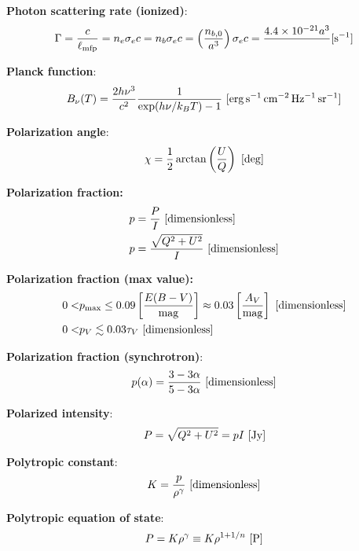 \documentclass[a4paper,10pt]{article}
\begin{document}
{\noindent}\textbf{Photon scattering rate (ionized)}:
\begin{align*}
    \Gamma = \dfrac{c}{\ell_\mathrm{mfp}} = n_e\sigma_ec = n_b\sigma_ec = \left(\dfrac{n_{b,0}}{a^3}\right)\sigma_ec = \dfrac{4.4\times10^{-21}{a^3}} ~ [{\rm s^{-1}}]
\end{align*}

{\noindent}\textbf{Planck function}:
\begin{align*}
    B_\nu(T) = \frac{2h\nu^3 }{c^2} \frac{1}{\exp(h\nu/k_BT) - 1} ~ [{\rm erg\,s^{-1}\,cm^{-2}\,Hz^{-1}\,sr^{-1}}]
\end{align*}

{\noindent}\textbf{Polarization angle}:
\begin{align*}
    \chi = \frac{1}{2}\arctan\left(\frac{U}{Q}\right) ~ [{\rm deg}]
\end{align*}

{\noindent}\textbf{Polarization fraction:}
\begin{align*}
    p &= \dfrac{P}{I} ~ [{\rm dimensionless}] \\
    p &= \frac{\sqrt{Q^2+U^2}}{I} ~ [{\rm dimensionless}]
\end{align*}

{\noindent}\textbf{Polarization fraction (max value):}
\begin{align*}
    0 < &p_\mathrm{max} \leq 0.09 \left[\frac{E(B-V)}{{\rm mag}}\right] \approx 0.03\left[\frac{A_V}{{\rm mag}}\right] ~ [{\rm dimensionless}] \\
    0 < &p_V \lesssim 0.03\tau_V ~ [{\rm dimensionless}]
\end{align*}

{\noindent}\textbf{Polarization fraction (synchrotron)}:
\begin{align*}
    p(\alpha) = \frac{3-3\alpha}{5-3\alpha} ~ [{\rm dimensionless}]
\end{align*}

{\noindent}\textbf{Polarized intensity}:
\begin{align*}
    P = \sqrt{Q^2 + U^2} = pI ~ [{\rm Jy}]
\end{align*}

{\noindent}\textbf{Polytropic constant}:
\begin{align*}
    K = \frac{p}{\rho^\gamma} ~ [{\rm dimensionless}]
\end{align*}

{\noindent}\textbf{Polytropic equation of state}:
\begin{align*}
    P = K\rho^\gamma \equiv K\rho^{1+1/n} ~ [{\rm P}]
\end{align*}
\end{document}
